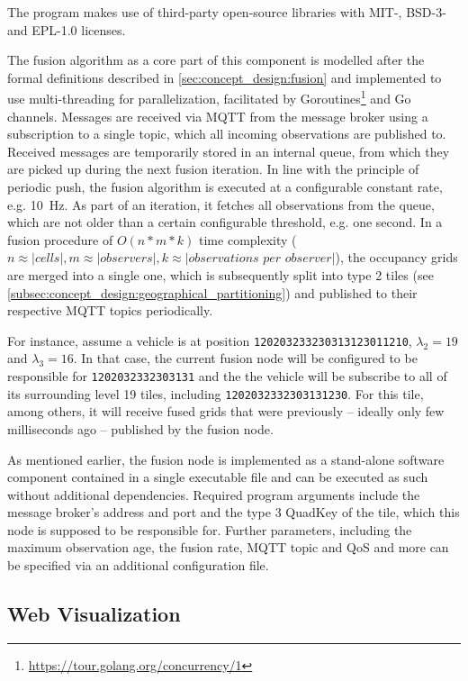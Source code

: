 The program makes use of third-party open-source libraries  with MIT-, BSD-3- and EPL-1.0 licenses.
\par
\bigskip

The fusion algorithm as a core part of this component is modelled after the formal definitions described in \cref{sec:concept_design:fusion} and implemented to use multi-threading for parallelization, facilitated by Goroutines\footnote{\url{https://tour.golang.org/concurrency/1}} and Go channels. Messages are received via MQTT from the message broker using a subscription to a single topic, which all incoming observations are published to. Received messages are temporarily stored in an internal queue, from which they are picked up during the next fusion iteration. In line with the principle of periodic push, the fusion algorithm is executed at a configurable constant rate, e.g. \SI{10}{\hertz}. As part of an iteration, it fetches all observations from the queue, which are not older than a certain configurable threshold, e.g. one second. In a fusion procedure of $O(n*m*k)$ time complexity ($n \approx |\textit{cells}|, m \approx |\textit{observers}|, k \approx |\textit{observations per observer}|$), the occupancy grids are merged into a single one, which is subsequently split into type 2 tiles (see \cref{subsec:concept_design:geographical_partitioning}) and published to their respective MQTT topics periodically.

For instance, assume a vehicle is at position \texttt{120203233230313123011210}, $\lambda_2 = 19$ and $\lambda_3 = 16$. In that case, the current fusion node will be configured to be responsible for \texttt{1202032332303131} and the the vehicle will be subscribe to all of its surrounding level 19 tiles, including \texttt{1202032332303131230}. For this tile, among others, it will receive fused grids that were previously – ideally only few milliseconds ago – published by the fusion node.
\par
\bigskip

As mentioned earlier, the fusion node is implemented as a stand-alone software component contained in a single executable file and can be executed as such without additional dependencies. Required program arguments include the message broker's address and port and the type 3 QuadKey of the tile, which this node is supposed to be responsible for. Further parameters, including the maximum observation age, the fusion rate, MQTT topic and QoS and more can be specified via an additional configuration file.

\subsection{Web Visualization}
\label{subsec:implementation:web_visualization}

